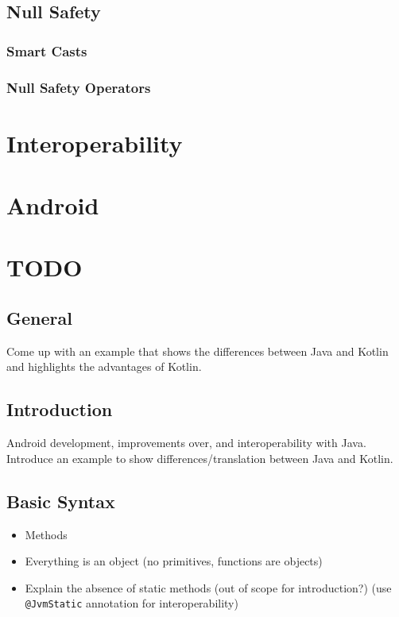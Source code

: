 \documentclass[a4paper, 11pt]{article}
\begin{document}
\subsection{Null Safety}
\subsubsection{Smart Casts}
\subsubsection{Null Safety Operators}

\section{Interoperability}
\section{Android}



\section{TODO}
\subsection{General}
  Come up with an example that shows the differences between Java and Kotlin and highlights the advantages of Kotlin.

\subsection{Introduction}
  Android development, improvements over, and interoperability with Java.
  Introduce an example to show differences/translation between Java and Kotlin.

\subsection{Basic Syntax}
\begin{itemize}
  \item Methods
  \item Everything is an object (no primitives, functions are objects)
  \item Explain the absence of static methods (out of scope for introduction?) (use \texttt{@JvmStatic} annotation for interoperability)
\end{itemize}
\end{document}
